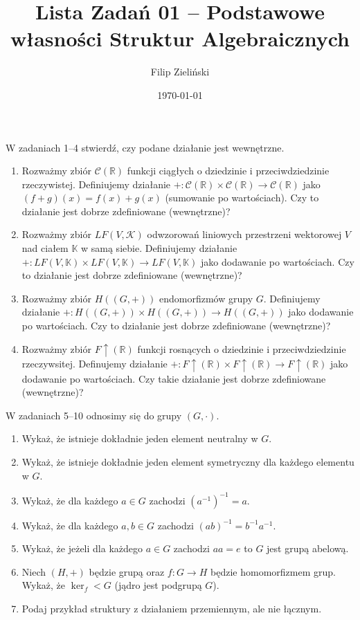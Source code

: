 \documentclass{article}
\title{Lista Zadań 01 -- Podstawowe własności Struktur Algebraicznych}
\author{Filip Zieliński}
\date{\today}
\begin{document}
\maketitle

W zadaniach 1--4 stwierdź, czy podane działanie jest wewnętrzne.
\begin{enumerate}
    \item Rozważmy zbiór $\mathcal{C}(\mathbb{R})$ funkcji ciągłych o dziedzinie i przeciwdziedzinie rzeczywistej. Definiujemy działanie $+ : \mathcal{C}(\mathbb{R}) \times \mathcal{C}(\mathbb{R}) \rightarrow \mathcal{C}(\mathbb{R})$ jako $(f + g)(x) = f(x) + g(x)$ (sumowanie po wartościach). Czy to działanie jest dobrze zdefiniowane (wewnętrzne)?
    \item Rozważmy zbiór $LF(V,\mathcal{K})$ odwzorowań liniowych przestrzeni wektorowej $V$ nad ciałem $\mathbb{K}$ w samą siebie. Definiujemy działanie $+ : LF(V,\mathbb{K}) \times LF(V, \mathbb{K}) \rightarrow LF(V,\mathbb{K})$ jako dodawanie po wartościach. Czy to działanie jest dobrze zdefiniowane (wewnętrzne)?
    \item Rozważmy zbiór $H((G, +))$ endomorfizmów grupy $G$. Definiujemy działanie $+ : H((G, +)) \times H((G, +)) \rightarrow H((G, +))$ jako dodawanie po wartościach. Czy to działanie jest dobrze zdefiniowane (wewnętrzne)?
    \item Rozważmy zbiór $F\uparrow(\mathbb{R})$ funkcji rosnących o dziedzinie i przeciwdziedzinie rzeczywsitej. Definujemy działanie $ + : F\uparrow(\mathbb{R}) \times F\uparrow(\mathbb{R}) \rightarrow F\uparrow(\mathbb{R})$ jako dodawanie po wartościach. Czy takie działanie jest dobrze zdefiniowane (wewnętrzne)?
\end{enumerate}

W zadaniach 5--10 odnosimy się do grupy $(G,\cdot)$.
\begin{enumerate}[resume]
    \item Wykaż, że istnieje dokładnie jeden element neutralny w $G$.
    \item Wykaż, że istnieje dokładnie jeden element symetryczny dla każdego elementu w $G$.
    \item Wykaż, że dla każdego $a \in G$ zachodzi $ (a^{-1})^{-1} = a$.
    \item Wykaż, że dla każdego $a,b \in G$ zachodzi $ (ab)^{-1} = b^{-1}a^{-1}$.
    \item Wykaż, że jeżeli dla każdego $a \in G$ zachodzi $a a = e$ to $G$ jest grupą abelową.
    \item Niech $(H, +)$ będzie grupą oraz $f : G \rightarrow H$ będzie homomorfizmem grup. Wykaż, że $\ker_f < G$ (jądro jest podgrupą $G$).
    \item Podaj przykład struktury z działaniem przemiennym, ale nie łącznym.
\end{enumerate}
\end{document}
